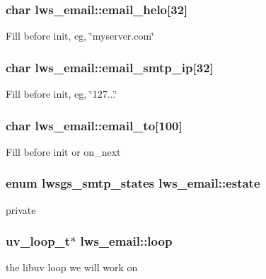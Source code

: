 \subsubsection[{\texorpdfstring{email\+\_\+helo}{email\_helo}}]{\setlength{\rightskip}{0pt plus 5cm}char lws\+\_\+email\+::email\+\_\+helo\mbox{[}32\mbox{]}}\hypertarget{structlws__email_a939e5d7ee0339a16de73bde71ab4d4d9}{}\label{structlws__email_a939e5d7ee0339a16de73bde71ab4d4d9}
Fill before init, eg, \char`\"{}myserver.\+com\char`\"{} 
\subsubsection[{\texorpdfstring{email\+\_\+smtp\+\_\+ip}{email\_smtp\_ip}}]{\setlength{\rightskip}{0pt plus 5cm}char lws\+\_\+email\+::email\+\_\+smtp\+\_\+ip\mbox{[}32\mbox{]}}\hypertarget{structlws__email_a472ae23fc9fca6599e5c512bc21458d2}{}\label{structlws__email_a472ae23fc9fca6599e5c512bc21458d2}
Fill before init, eg, \char`\"{}127...\char`\"{} 
\subsubsection[{\texorpdfstring{email\+\_\+to}{email\_to}}]{\setlength{\rightskip}{0pt plus 5cm}char lws\+\_\+email\+::email\+\_\+to\mbox{[}100\mbox{]}}\hypertarget{structlws__email_a6453a8b92b3de6d2c2101af3edce685e}{}\label{structlws__email_a6453a8b92b3de6d2c2101af3edce685e}
Fill before init or on\+\_\+next 
\subsubsection[{\texorpdfstring{estate}{estate}}]{\setlength{\rightskip}{0pt plus 5cm}enum {\bf lwsgs\+\_\+smtp\+\_\+states} lws\+\_\+email\+::estate}\hypertarget{structlws__email_ac6115d3cbef2e8bac62cc00895bf5fd3}{}\label{structlws__email_ac6115d3cbef2e8bac62cc00895bf5fd3}
private 
\subsubsection[{\texorpdfstring{loop}{loop}}]{\setlength{\rightskip}{0pt plus 5cm}uv\+\_\+loop\+\_\+t$\ast$ lws\+\_\+email\+::loop}\hypertarget{structlws__email_ab5fbf121195a8e67509c78a42cfbe168}{}\label{structlws__email_ab5fbf121195a8e67509c78a42cfbe168}
the libuv loop we will work on 
